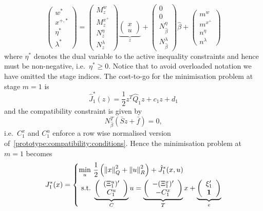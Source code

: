 \documentclass{ifacconf}
\providecommand{\norm}[1]{\left\|#1\right\|}
\begin{document}
\[
      \left(\begin{array}{c}
      w^\ast \\
      x^{+,\ast} \\
      \eta^\ast \\
      \lambda^\ast
      \end{array}\right) = \left(\begin{array}{c}M^w_z\\ M^{x^+}_z \\ N^{\eta}_z \\ N^{\lambda}_z
      \end{array}\right)\underbrace{\left(\begin{array}{c}x\\ u\end{array}\right)}_z + 
      \left(\begin{array}{c}0\\ 0 \\ N^{\eta}_{\hat\beta} \\ N^{\lambda}_{\hat\beta}
      \end{array}\right)\hat\beta + \left(\begin{array}{c}m^w\\ m^{x^+} \\ n^{\eta} \\ n^{\lambda}
      \end{array}\right)
\]
where $\eta^\ast$ denotes the dual variable to the active inequality constraints and hence must
be non-negative, i.e.~$\eta^\ast\geq0$. Notice that to avoid
overloaded notation we have omitted the stage indices.
The cost-to-go for the minimisation problem at stage $m=1$ is
\[
	\hat J_1^\ast(z) = \frac{1}{2}z^T
    \hat Q_1 z + c_1 z + d_1
\]
and the compatibility constraint is given by
\begin{equation}\label{prototype:compatibility:conditions}
	N_{\hat\beta}^T(\bar S z + \bar f) = 0,
\end{equation}
i.e.\ $C_1^x$ and $C_1^u$ enforce a row wise normalised version of~\eqref{prototype:compatibility:conditions}.
Hence the minimisation problem at $m=1$ becomes
\[
	J_1^\ast(x) = \left\{\begin{split}
	\min_{u} \ & \frac{1}{2}\left(\norm{x}^2_Q + \norm{u}_R^2\right) + \hat J_{1}^\ast(x,u)\\
    \text{s.t.} \ & 
    \underbrace{\left(\begin{array}{c}
    (\Xi_1^u)^\prime \\ C_1^u
    \end{array}\right)}_{\bar C}
    u
    = \underbrace{\left(\begin{array}{c}-(\Xi^x_1)^\prime \\ -C_1^x\end{array}\right)}_{
    \bar T
    }x + 
    \underbrace{\left(\begin{array}{c}\xi_1^\prime\\  {\bf{1}} \end{array}\right)}_{\bar e}
    \end{split}\right.
\]
\end{document}
